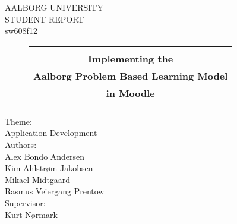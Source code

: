 
	\parbox[center][\textheight][c]{\textwidth}{
		\begin{center}
			\thispagestyle{empty}

			\LARGE
			AALBORG UNIVERSITY \\


			STUDENT REPORT \\
			sw608f12 \\ 
			
			\vspace{10mm}
			
			\begin{figure}[H]%
			\centering
			\LARGE
			\begin{tabular}{ c }
			\hline \\
				\textbf{Implementing the} \\
				\textbf{Aalborg Problem Based Learning Model} \\ 
				\textbf{in Moodle} \\ \\
			\hline 
			\end{tabular}
			\end{figure}
			
			\large
			
			Theme: \\
			Application Development \\
			 
			\vspace{6mm}
			Authors: \\
			Alex Bondo Andersen\\
			Kim Ahlstr\o{}m Jakobsen\\
			Mikael Midtgaard\\
			Rasmus Veiergang Prentow\\ 
			
			\vspace{6mm}
			Supervisor: \\
			Kurt N\o{}rmark \\
			

		\end{center}		
	}
